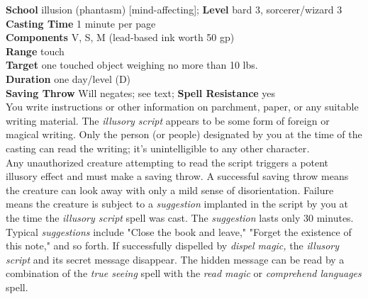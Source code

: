 \textbf{School} illusion (phantasm) [mind-affecting]; \textbf{Level} bard 3, sorcerer/wizard 3\\
\textbf{Casting Time} 1 minute per page\\
\textbf{Components} V, S, M (lead-based ink worth 50 gp)\\
\textbf{Range} touch\\
\textbf{Target} one touched object weighing no more than 10 lbs.\\
\textbf{Duration} one day/level (D)\\
\textbf{Saving Throw }Will negates; see text; \textbf{Spell Resistance} yes\\
You write instructions or other information on parchment, paper, or any suitable writing material. The \textit{illusory script }appears to be some form of foreign or magical writing. Only the person (or people) designated by you at the time of the casting can read the writing; it's unintelligible to any other character\textit{.}\\
Any unauthorized creature attempting to read the script triggers a potent illusory effect and must make a saving throw. A successful saving throw means the creature can look away with only a mild sense of disorientation. Failure means the creature is subject to a \textit{suggestion} implanted in the script by you at the time the \textit{illusory script} spell was cast. The \textit{suggestion} lasts only 30 minutes. Typical \textit{suggestions} include "Close the book and leave," "Forget the existence of this note," and so forth. If successfully dispelled by \textit{dispel magic, }the \textit{illusory script }and its secret message disappear. The hidden message can be read by a combination of the \textit{true seeing }spell with the \textit{read magic }or \textit{comprehend languages }spell.\\
